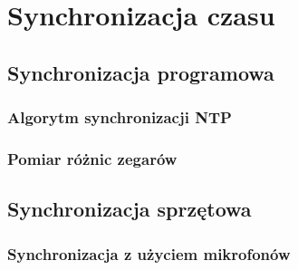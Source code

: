 \chapter{Synchronizacja czasu}

\section{Synchronizacja programowa}

\subsection{Algorytm synchronizacji NTP}

\subsection{Pomiar różnic zegarów}

\section{Synchronizacja sprzętowa}

\subsection{Synchronizacja z użyciem mikrofonów}

